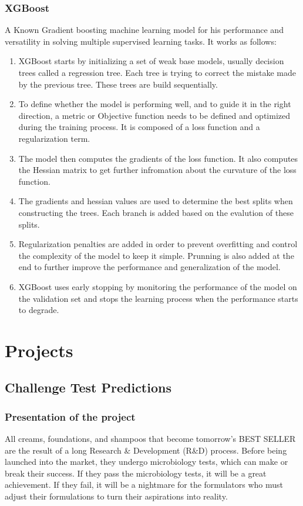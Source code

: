 \documentclass[a4paper,12pt,twoside]{report}
\begin{document}
\subsection{XGBoost}
A Known Gradient boosting machine learning model for his performance and versatility in solving multiple supervised learning tasks. It works as follows:
\begin{enumerate}	
\item XGBoost starts by initializing a set of weak base models, usually decision trees called a regression tree. Each tree is trying to correct the mistake made by the previous tree. These trees are build sequentially.
\item To define whether the model is performing well, and to guide it in the right direction, a metric or Objective function needs to be defined and optimized during the training process. It is composed of a loss function and a regularization term.
\item The model then computes the gradients of the loss function. It also computes the Hessian matrix to get further infromation about the curvature of the loss function.
\item The gradients and hessian values are used to determine the best splits when constructing the trees. Each branch is added based on the evalution of these splits.
\item Regularization penalties are added in order to prevent overfitting and control the complexity of the model to keep it simple. Prunning is also added at the end to further improve the performance and generalization of the model.
\item XGBoost uses early stopping by monitoring the performance of the model on the validation set and stops the learning process when the performance starts to degrade.
\end{enumerate}
\chapter{Projects}
\thispagestyle{empty}
\section{Challenge Test Predictions}
\subsection{Presentation of the project}
All creams, foundations, and shampoos that become tomorrow's BEST SELLER are the result of a long Research \& Development (R\&D) process. Before being launched into the market, they undergo microbiology tests, which can make or break their success. If they pass the microbiology tests, it will be a great achievement. If they fail, it will be a nightmare for the formulators who must adjust their formulations to turn their aspirations into reality.
\end{document}
